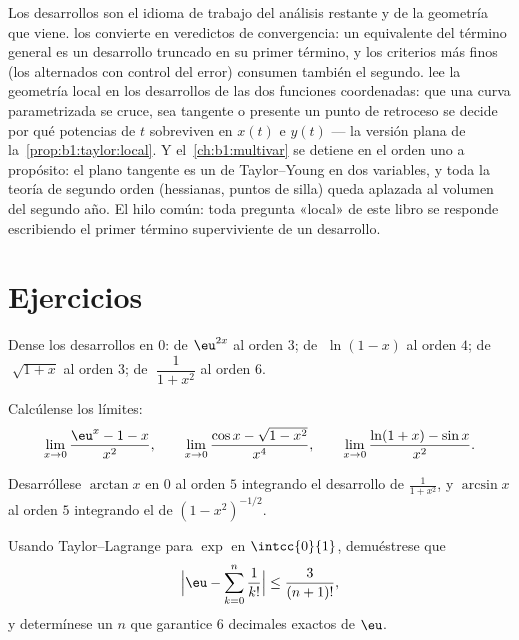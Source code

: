 \begin{remark}
Los desarrollos son el idioma de trabajo del análisis restante y de
la geometría que viene.  los convierte en
veredictos de convergencia: un equivalente del término general es un
desarrollo truncado en su primer término, y los criterios más finos
(los alternados con control del error) consumen también el segundo.
 lee la geometría local en los desarrollos de las
dos funciones coordenadas: que una curva parametrizada se cruce, sea
tangente o presente un punto de retroceso se decide por qué potencias
de $t$ sobreviven en $x(t)$ e $y(t)$ --- la versión plana de
la~\cref{prop:b1:taylor:local}. Y el~\cref{ch:b1:multivar} se detiene
en el orden uno a propósito: el plano tangente es un  de
Taylor--Young en dos variables, y toda la teoría de segundo orden
(hessianas, puntos de silla) queda aplazada al volumen del segundo
año. El hilo común: toda pregunta «local» de este libro se responde
escribiendo el primer término superviviente de un desarrollo.
\end{remark}

\section{Ejercicios}

\begin{exercise}[$\star$]\label{exo:b1:taylor:1}
Dense los desarrollos en $0$: de $\eu^{2x}$ al orden $3$; de
$\;\ln(1 - x)$ al orden $4$; de $\;\sqrt{1 + x}$ al orden $3$; de
$\;\dfrac{1}{1 + x^2}$ al orden $6$.
\end{exercise}

\begin{exercise}[$\star$]\label{exo:b1:taylor:2}
Calcúlense los límites:
\[
\lim_{x\to 0} \frac{\eu^x - 1 - x}{x^2},
\qquad
\lim_{x\to 0} \frac{\cos x - \sqrt{1 - x^2}}{x^4},
\qquad
\lim_{x\to 0} \frac{\ln(1+x) - \sin x}{x^2}.
\]
\end{exercise}

\begin{exercise}[$\star$]\label{exo:b1:taylor:3}
Desarróllese $\arctan x$ en $0$ al orden $5$ integrando el desarrollo
de $\frac{1}{1 + x^2}$, y $\arcsin x$ al orden $5$ integrando el de
$(1 - x^2)^{-1/2}$.
\end{exercise}

\begin{exercise}[$\star$]\label{exo:b1:taylor:4}
Usando Taylor--Lagrange para $\exp$ en $\intcc{0}{1}$, demuéstrese que
\[
\Bigl| \eu - \sum_{k=0}^{n} \frac{1}{k!} \Bigr| \leq
\frac{3}{(n+1)!},
\]
y determínese un $n$ que garantice $6$ decimales exactos de $\eu$.
\end{exercise}

